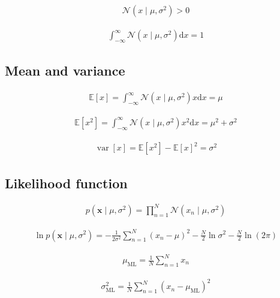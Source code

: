 \documentclass{article}
\begin{document}
\begin{align*}
\mathcal{N}\left(x \mid \mu, \sigma^{2}\right)>0
\tag{2.50}
\end{align*}

\begin{align*}
\int_{-\infty}^{\infty} \mathcal{N}\left(x \mid \mu, \sigma^{2}\right) \mathrm{d} x=1
\tag{2.51}
\end{align*}

\subsection{Mean and variance}

\begin{align*}
\mathbb{E}[x] = \int_{-\infty}^{\infty} \mathcal{N}\left(x \mid \mu, \sigma^{2}\right) x \mathrm{d} x = \mu
\tag{2.52}
\end{align*}

\begin{align*}
\mathbb{E}\left[ x^{2} \right] = \int_{-\infty}^{\infty} \mathcal{N}\left(x \mid \mu, \sigma^{2}\right) x^{2} \mathrm{d} x = \mu^{2} + \sigma^{2}
\tag{2.53}
\end{align*}

\begin{align*}
\operatorname{var}[x] = \mathbb{E}\left[ x^{2} \right] - \mathbb{E}[x]^{2} = \sigma^{2}
\tag{2.54}
\end{align*}

\subsection{Likelihood function}

\begin{align*}
p\left(\mathbf{x} \mid \mu, \sigma^{2}\right) = \prod_{n=1}^{N} \mathcal{N}\left(x_{n} \mid \mu, \sigma^{2}\right)
\tag{2.55}
\end{align*}

\begin{align*}
\ln p\left(\mathbf{x} \mid \mu, \sigma^{2}\right) = -\frac{1}{2 \sigma^{2}} \sum_{n=1}^{N}\left( x_n - \mu \right)^2 - \frac{N}{2} \ln \sigma^{2} - \frac{N}{2} \ln (2 \pi)
\tag{2.56}
\end{align*}

\begin{align*}
\mu_{\mathrm{ML}} = \frac{1}{N} \sum_{n=1}^{N} x_n
\tag{2.57}
\end{align*}

\begin{align*}
\sigma_{\mathrm{ML}}^{2} = \frac{1}{N} \sum_{n=1}^{N} \left( x_n - \mu_{\mathrm{ML}} \right)^2
\tag{2.58}
\end{align*}
\end{document}
